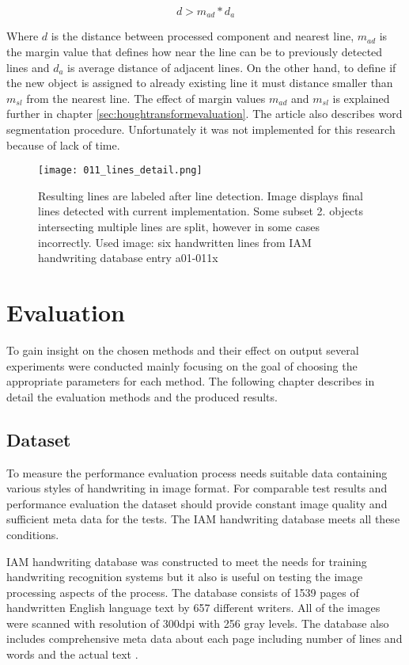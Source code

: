 \documentclass{article}
\begin{document}
            \begin{equation}
              d >  m_{ad}*d_a
            \end{equation}

            Where $d$ is the distance between processed component and nearest line, $m_{ad}$ is the margin value that defines how near the line can be to previously detected lines and $d_a$ is average distance of adjacent lines. On the other hand, to define if the new object is assigned to already existing line it must distance smaller than $m_{sl}$ from the nearest line. The effect of margin values $m_{ad}$ and $m_{sl}$ is explained further in chapter \ref{sec:houghtransformevaluation}. The article \cite{Louloudis2} also describes word segmentation procedure. Unfortunately it was not implemented for this research because of lack of time.

            \begin{figure}[!ht]
              \centering
              \texttt{[image: 011\_lines\_detail.png]}
              \caption{Resulting lines are labeled after line detection. Image displays final lines detected with current implementation. Some subset 2. objects intersecting multiple lines are split, however in some cases incorrectly. Used image: six handwritten lines from IAM handwriting database entry a01-011x \label{fig:finallines} }
            \end{figure}

  \newpage
  \section{Evaluation}
    To gain insight on the chosen methods and their effect on output several experiments were conducted mainly focusing on the goal of choosing the appropriate parameters for each method. The following chapter describes in detail the evaluation methods and the produced results.

  \subsection{Dataset}
    To measure the performance evaluation process needs suitable data containing various styles of handwriting in image format. For comparable test results and performance evaluation the dataset should provide constant image quality and sufficient meta data for the tests. The IAM handwriting database meets all these conditions.

    IAM handwriting database was constructed to meet the needs for training handwriting recognition systems but it also is useful on testing the image processing aspects of the process. The database consists of 1539 pages of handwritten English language text by 657 different writers. All of the images were scanned with resolution of 300dpi with 256 gray levels. The database also includes comprehensive meta data about each page including number of lines and words and the actual text \cite{IAM}.
\end{document}
